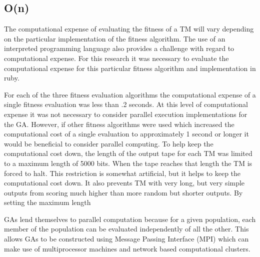 \subsection{O(n)}
The computational expense of evaluating the fitness of a TM will vary depending on the particular implementation of the fitness algorithm. The use of an interpreted programming language also provides a challenge with regard to computational expense. For this research it was necessary to evaluate the computational expense for this particular fitness algorithm and implementation in ruby. 

For each of the three fitness evaluation algorithms the computational expense of a single fitness evaluation was less than .2 seconds. At this level of computational expense it was not necessary to consider parallel execution implementations for the GA. However, if other fitness algorithms were used which increased the computational cost of a single evaluation to approximately 1 second or longer it would be beneficial to consider parallel computing. To help keep the computational cost down, the length of the output tape for each TM was limited to a maximum length of 5000 bits. When the tape reaches that length the TM is forced to halt. This restriction is somewhat artificial, but it helps to keep the computational cost down. It also prevents TM with very long, but very simple outputs from scoring much higher than more random but shorter outputs. By setting the maximum length 

GAs lend themselves to parallel computation because for a given population, each member of the population can be evaluated independently of all the other. This allows GAs to be constructed using Message Passing Interface (MPI) which can make use of multiprocessor machines and network based computational clusters. 

